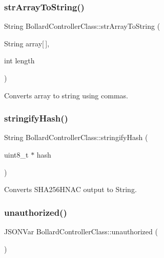 \subsubsection{\texorpdfstring{str\+Array\+To\+String()}{strArrayToString()}}
{\footnotesize\ttfamily String Bollard\+Controller\+Class\+::str\+Array\+To\+String (\begin{DoxyParamCaption}\item[{String}]{array\mbox{[}$\,$\mbox{]},  }\item[{int}]{length }\end{DoxyParamCaption})\hspace{0.3cm}{\ttfamily [private]}}

Converts array to string using commas. \mbox{\label{class_bollard_controller_class_a909392fb23d4fd17ca8f59dd4bbcbec1}} 
\subsubsection{\texorpdfstring{stringify\+Hash()}{stringifyHash()}}
{\footnotesize\ttfamily String Bollard\+Controller\+Class\+::stringify\+Hash (\begin{DoxyParamCaption}\item[{uint8\+\_\+t $\ast$}]{hash }\end{DoxyParamCaption})\hspace{0.3cm}{\ttfamily [private]}}

Converts S\+H\+A256\+H\+N\+AC output to String. \mbox{\label{class_bollard_controller_class_a44b4123649f5bffc436e544c85b0af15}} 
\subsubsection{\texorpdfstring{unauthorized()}{unauthorized()}}
{\footnotesize\ttfamily J\+S\+O\+N\+Var Bollard\+Controller\+Class\+::unauthorized (\begin{DoxyParamCaption}{ }\end{DoxyParamCaption})\hspace{0.3cm}{\ttfamily [private]}}

